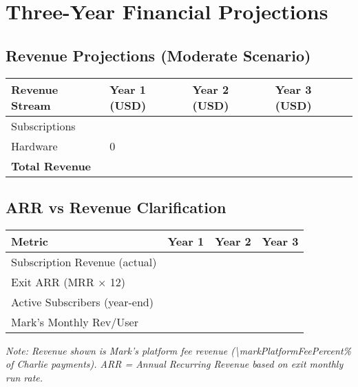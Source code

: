 
\section{Three-Year Financial Projections}

\subsection{Revenue Projections (Moderate Scenario)}
\begin{table}[H]
\centering
\begin{tabularx}{\linewidth}{l Y Y Y}
\toprule
Revenue Stream & Year 1 (USD) & Year 2 (USD) & Year 3 (USD) \\\midrule
Subscriptions & \numint{\subRevenueYearOne} & \numint{\subRevenueYearTwo} & \numint{\subRevenueYearThree} \\
Hardware & \num{0} & \numint{\hwWeightedAvgGP * \hwCustomersYearTwo} & \numint{\hwWeightedAvgGP * \hwCustomersYearThree} \\\midrule
\textbf{Total Revenue} & \textbf{\numint{\subRevenueYearOne}} & \textbf{\numint{\subRevenueYearTwo + \hwWeightedAvgGP * \hwCustomersYearTwo}} & \textbf{\numint{\subRevenueYearThree + \hwWeightedAvgGP * \hwCustomersYearThree}} \\
\bottomrule
\end{tabularx}
\end{table}

\subsection{ARR vs Revenue Clarification}
\begin{table}[H]
\centering
\begin{tabularx}{\linewidth}{l Y Y Y}
\toprule
Metric & Year 1 & Year 2 & Year 3 \\\midrule
Subscription Revenue (actual) & \numint{\subRevenueYearOne} & \numint{\subRevenueYearTwo} & \numint{\subRevenueYearThree} \\
Exit ARR (MRR $\times$ 12) & \numint{\subARRYearOne} & \numint{\subARRYearTwo} & \numint{\subARRYearThree} \\
Active Subscribers (year-end) & \numint{\totalSubsYearOne} & \numint{\totalSubsYearTwo} & \numint{\totalSubsYearThree} \\
Mark's Monthly Rev/User & \numfpeval{\markWeightedAvgMonthly} & \numfpeval{\markWeightedAvgMonthly} & \numfpeval{\markWeightedAvgMonthly} \\
\bottomrule
\end{tabularx}
\end{table}
\textit{Note: Revenue shown is Mark's platform fee revenue (\num{\markPlatformFeePercent}\% of Charlie payments). ARR = Annual Recurring Revenue based on exit monthly run rate.}

